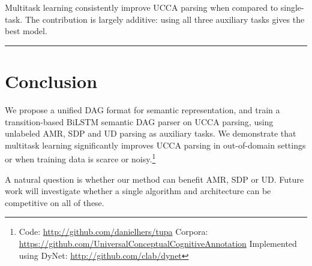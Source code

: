 \documentclass[a0,portrait]{a0poster}
\begin{document}
\begin{multicols}{2}
Multitask learning consistently improve UCCA parsing when compared to single-task.
The contribution is largely additive: using all three auxiliary tasks gives the best model.

\hrule


\section*{Conclusion}

We propose a unified DAG format for semantic representation,
and train a transition-based BiLSTM semantic DAG parser on UCCA parsing,
using unlabeled AMR, SDP and UD parsing as auxiliary tasks.
We demonstrate that multitask learning significantly improves UCCA parsing in out-of-domain settings
or when training data is scarce or noisy.\footnote{Code:
\url{http://github.com/danielhers/tupa} \hfill
Corpora: \url{https://github.com/UniversalConceptualCognitiveAnnotation} \hfill
Implemented using DyNet: \url{http://github.com/clab/dynet}}

A natural question is whether our method can benefit AMR, SDP or UD.
Future work will investigate whether a single
algorithm and architecture can be competitive on all of these.


\end{multicols}
\end{document}
